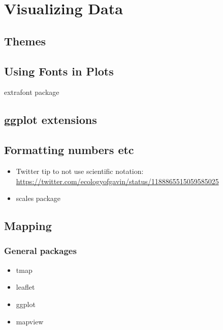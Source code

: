 \documentclass[]{book}
\providecommand{\tightlist}{%
  \setlength{\itemsep}{0pt}\setlength{\parskip}{0pt}}
\begin{document}
\hypertarget{visualizing-data}{%
\chapter{Visualizing Data}\label{visualizing-data}}

\hypertarget{themes}{%
\section{Themes}\label{themes}}

\hypertarget{using-fonts-in-plots}{%
\section{Using Fonts in Plots}\label{using-fonts-in-plots}}

extrafont package

\hypertarget{ggplot-extensions}{%
\section{ggplot extensions}\label{ggplot-extensions}}

\hypertarget{formatting-numbers-etc}{%
\section{Formatting numbers etc}\label{formatting-numbers-etc}}

\begin{itemize}
\tightlist
\item
  Twitter tip to not use scientific notation: \url{https://twitter.com/ecologyofgavin/status/1188865515059585025}
\item
  scales package
\end{itemize}

\hypertarget{mapping}{%
\section{Mapping}\label{mapping}}

\hypertarget{general-packages}{%
\subsection{General packages}\label{general-packages}}

\begin{itemize}
\tightlist
\item
  tmap
\item
  leaflet
\item
  ggplot
\item
  mapview
\end{itemize}
\end{document}
